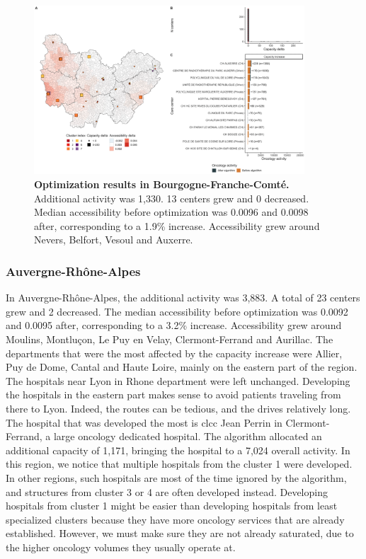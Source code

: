 \begin{figure}[h!]
    \includegraphics[width=0.9\textwidth]{images/camion/optim_region/optim_Bourgogne-Franche-Comte.png}
    \centering
    \caption{ \textbf{Optimization results in Bourgogne-Franche-Comté.}
        Additional activity was 1,330. 13 centers grew and 0 decreased. Median
        accessibility before optimization was 0.0096 and 0.0098 after,
        corresponding to a 1.9\% increase. Accessibility grew around Nevers,
        Belfort, Vesoul and Auxerre. }
\end{figure}

\subsubsection{Auvergne-Rhône-Alpes}

In Auvergne-Rhône-Alpes, the additional activity was 3,883. A total of 23
centers grew and 2 decreased. The median accessibility before optimization was
0.0092 and 0.0095 after, corresponding to a 3.2\% increase. Accessibility grew
around Moulins, Montluçon, Le Puy en Velay, Clermont-Ferrand and Aurillac. The
departments that were the most affected by the capacity increase were Allier,
Puy de Dome, Cantal and Haute Loire, mainly on the eastern part of the region.
The hospitals near Lyon in Rhone department were left unchanged. Developing
the hospitals in the eastern part makes sense to avoid patients traveling from
there to Lyon. Indeed, the routes can be tedious, and the drives relatively
long. The hospital that was developed the most is \ac{clcc} Jean Perrin in
Clermont-Ferrand, a large oncology dedicated hospital. The algorithm allocated
an additional capacity of 1,171, bringing the hospital to a 7,024 overall
activity. In this region, we notice that multiple hospitals from the cluster 1
were developed. In other regions, such hospitals are most of the time ignored
by the algorithm, and structures from cluster 3 or 4 are often developed instead.
Developing hospitals from cluster 1 might be easier than developing hospitals
from least specialized clusters because they have more oncology services that
are already established. However, we must make sure they are not already
saturated, due to the higher oncology volumes they usually operate at.

